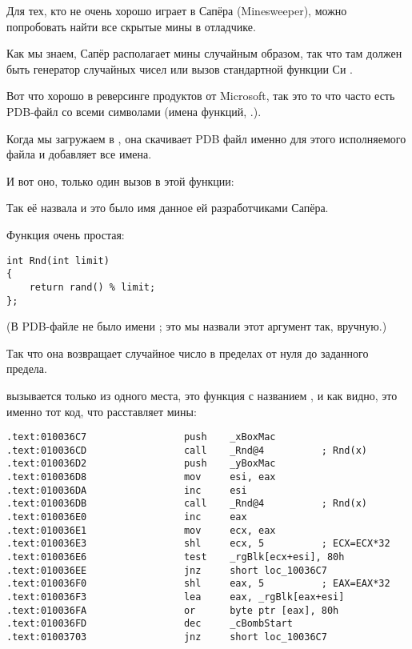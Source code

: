 \mysection{\MinesweeperWinXPExampleChapterName}
\label{minesweeper_winxp}

Для тех, кто не очень хорошо играет в Сапёра (Minesweeper), можно попробовать найти все скрытые мины в отладчике.

Как мы знаем, Сапёр располагает мины случайным образом, так что там должен быть генератор случайных чисел
или вызов стандартной функции Си .

Вот что хорошо в реверсинге продуктов от Microsoft, так это то что часто есть \gls{PDB}-файл со всеми
символами (имена функций, \etc{}.).

Когда мы загружаем  в \IDA, она скачивает 
\gls{PDB} файл именно для этого исполняемого файла и добавляет все имена.

И вот оно, только один вызов  в этой функции:



Так её назвала \IDA и это было имя данное ей разработчиками Сапёра.

Функция очень простая:

\begin{lstlisting}[style=customc]
int Rnd(int limit)
{
    return rand() % limit;
};
\end{lstlisting}

(В \gls{PDB}-файле не было имени ; это мы назвали этот аргумент так, вручную.)

Так что она возвращает случайное число в пределах от нуля до заданного предела.

 вызывается только из одного места, это функция с названием , 
и как видно, это именно тот код, что расставляет мины:

\begin{lstlisting}[style=customasmx86]
.text:010036C7                 push    _xBoxMac
.text:010036CD                 call    _Rnd@4          ; Rnd(x)
.text:010036D2                 push    _yBoxMac
.text:010036D8                 mov     esi, eax
.text:010036DA                 inc     esi
.text:010036DB                 call    _Rnd@4          ; Rnd(x)
.text:010036E0                 inc     eax
.text:010036E1                 mov     ecx, eax
.text:010036E3                 shl     ecx, 5          ; ECX=ECX*32
.text:010036E6                 test    _rgBlk[ecx+esi], 80h
.text:010036EE                 jnz     short loc_10036C7
.text:010036F0                 shl     eax, 5          ; EAX=EAX*32
.text:010036F3                 lea     eax, _rgBlk[eax+esi]
.text:010036FA                 or      byte ptr [eax], 80h
.text:010036FD                 dec     _cBombStart
.text:01003703                 jnz     short loc_10036C7
\end{lstlisting}

